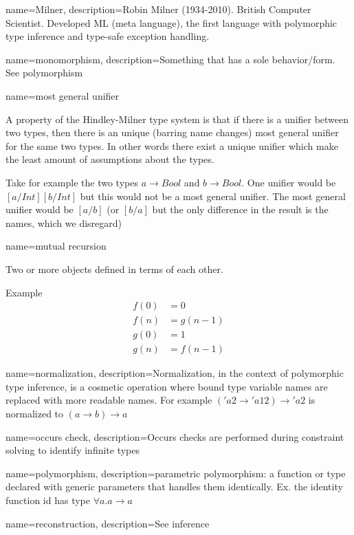{ name={Milner},
  description={Robin Milner (1934-2010). British Computer Scientist. Developed ML (meta language), the first language with polymorphic type inference and type-safe exception handling.}
} %

{ name={monomorphism},
  description={Something that has a sole behavior/form. See polymorphism}
}

{ name={most general unifier} }
{A property of the Hindley-Milner type system is that if there is a unifier between two types, then there is an unique (barring name changes) most general unifier for the same two types. In other words there exist a unique unifier which make the least amount of assumptions about the types.

Take for example the two types $a \to Bool$ and $b \to Bool$. One unifier would be
$[a/Int][b/Int]$ but this would not be a most general unifier. The most general unifier would be $[a/b]$ (or $[b/a]$ but the only difference in the result is the names, which we disregard)}

{ name={mutual recursion} }
{Two or more objects defined in terms of each other.

Example
\begin{align*}
f(0) &= 0 \\
f(n) &= g(n-1) \\
g(0) &= 1 \\
g(n) &= f(n-1)
\end{align*}
}

{ name={normalization},
  description={Normalization, in the context of polymorphic type inference, is a cosmetic operation where bound type variable names are replaced with more readable names. For example $('a2 \to 'a12) \to 'a2$ is normalized to $(a \to b) \to a$}
}

{ name={occurs check},
  description={Occurs checks are performed during constraint solving to identify infinite types}
}

{ name={polymorphism},
  description={parametric polymorphism: a function or type declared with generic parameters that handles them identically. Ex. the identity function id has type $\forall a . a \to a$}
}

{ name={reconstruction},
  description={See inference}
}


